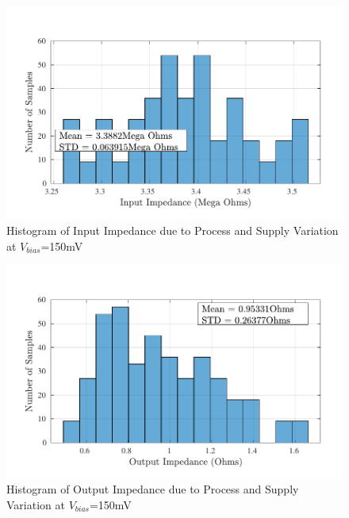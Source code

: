 \begin{figure} [H]
\centering
\includegraphics[scale=1]{Figures/Corners/Overall/PV_Min/PDFs/PV_Min_zin.pdf}
\caption{Histogram of Input Impedance due to Process and Supply Variation at $V_{bias}$=150mV}
\end{figure}

\begin{figure} [H]
\centering
\includegraphics[scale=1]{Figures/Corners/Overall/PV_Min/PDFs/PV_Min_zout.pdf}
\caption{Histogram of Output Impedance due to Process and Supply Variation at $V_{bias}$=150mV}
\end{figure}

